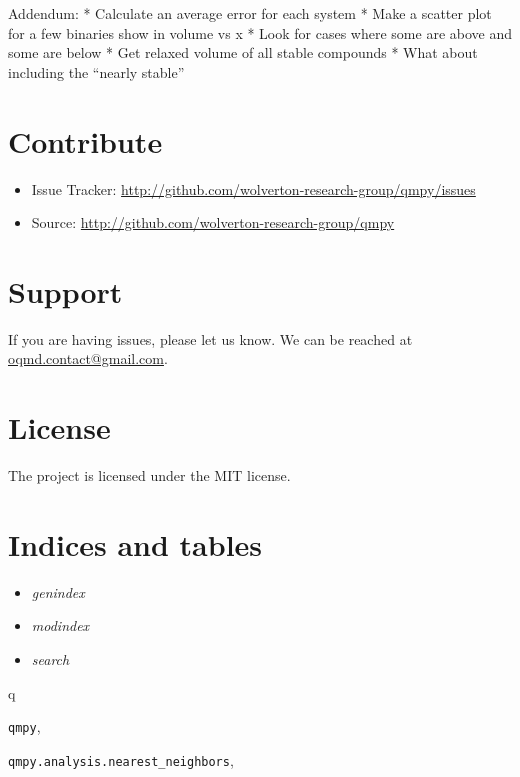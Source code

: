 \documentclass[letterpaper,10pt,english]{sphinxmanual}
\begin{document}
Addendum:
* Calculate an average error for each system
* Make a scatter plot for a few binaries show in volume vs x
* Look for cases where some are above and some are below
* Get relaxed volume of all stable compounds
* What about including the ``nearly stable''


\chapter{Contribute}
\label{index:contribute}\begin{itemize}
\item {} 
Issue Tracker: \href{http://github.com/wolverton-research-group/qmpy/issues}{http://github.com/wolverton-research-group/qmpy/issues}

\item {} 
Source: \href{http://github.com/wolverton-research-group/qmpy}{http://github.com/wolverton-research-group/qmpy}

\end{itemize}


\chapter{Support}
\label{index:support}
If you are having issues, please let us know.
We can be reached at \href{mailto:oqmd.contact@gmail.com}{oqmd.contact@gmail.com}.


\chapter{License}
\label{index:license}
The project is licensed under the MIT license.


\chapter{Indices and tables}
\label{index:indices-and-tables}\begin{itemize}
\item {} 
\emph{genindex}

\item {} 
\emph{modindex}

\item {} 
\emph{search}

\end{itemize}


\renewcommand{\indexname}{Python Module Index}
\begin{theindex}
\def\bigletter#1{{\Large\sffamily#1}\nopagebreak\vspace{1mm}}
\bigletter{q}
\item {\texttt{qmpy}}, \pageref{tutorials:module-qmpy}
\item {\texttt{qmpy.analysis.nearest\_neighbors}}, \pageref{models:module-qmpy.analysis.nearest_neighbors}
\end{theindex}

\renewcommand{\indexname}{Index}
\printindex
\end{document}
